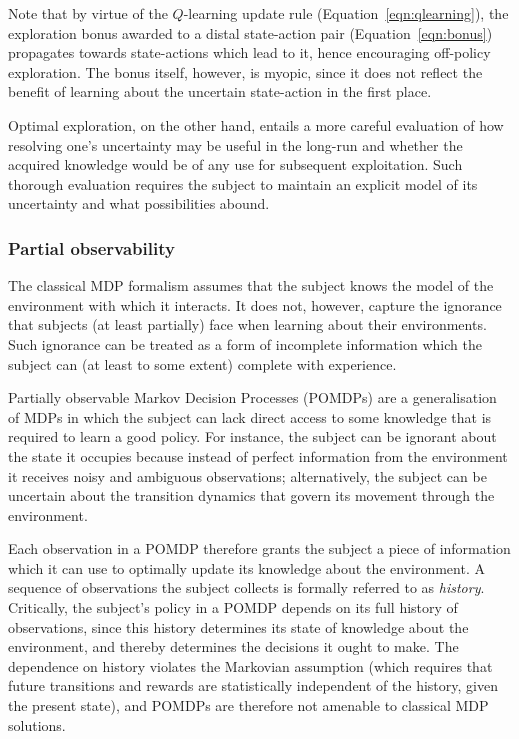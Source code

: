Note that by virtue of the $Q$-learning update rule (Equation~\ref{eqn:qlearning}), the exploration bonus awarded to a distal state-action pair (Equation~\ref{eqn:bonus}) propagates towards state-actions which lead to it, hence encouraging off-policy exploration. The bonus itself, however, is myopic, since it does not reflect the benefit of learning about the uncertain state-action in the first place. 

Optimal exploration, on the other hand, entails a more careful evaluation of how resolving one's uncertainty may be useful in the long-run and whether the acquired knowledge would be of any use for subsequent exploitation. Such thorough evaluation requires the subject to maintain an explicit model of its uncertainty and what possibilities abound.

\subsubsection*{Partial observability}

The classical MDP formalism assumes that the subject knows the model of the environment with which it interacts. It does not, however, capture the ignorance that subjects (at least partially) face when learning about their environments. Such ignorance can be treated as a form of incomplete information which the subject can (at least to some extent) complete with experience.

Partially observable Markov Decision Processes (POMDPs) are a generalisation of MDPs in which the subject can lack direct access to some knowledge that is required to learn a good policy. For instance, the subject can be ignorant about the state it occupies because instead of perfect information from the environment it receives noisy and ambiguous observations; alternatively, the subject can be uncertain about the transition dynamics that govern its movement through the environment.

Each observation in a POMDP therefore grants the subject a  piece of information which it can use to optimally update its knowledge about the environment. A sequence of observations the subject collects is formally referred to as \emph{history}. Critically, the subject's policy in a POMDP depends on its full history of observations, since this history determines its state of knowledge about the environment, and thereby determines the decisions it ought to make. The dependence on history violates the Markovian assumption (which requires that future transitions and rewards are statistically independent of the history, given the present state), and POMDPs are therefore not amenable to classical MDP solutions. 

